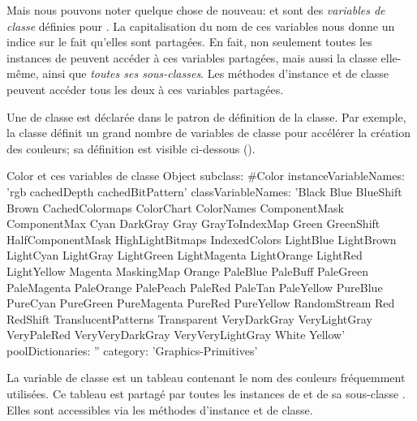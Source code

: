 \documentclass[a4paper,10pt,twoside]{book}
\begin{document}
Mais nous pouvons noter quelque chose de nouveau:  et  sont des \emph{variables de classe} d\'efinies pour .
La capitalisation du nom de ces variables nous donne un indice sur le fait qu'elles sont partag\'ees.
En fait, non seulement toutes les instances de  peuvent acc\'eder
\`a ces variables partag\'ees, mais aussi la classe  elle-m\^eme, ainsi que \emph{toutes ses sous-classes}.
Les m\'ethodes d'instance et de classe peuvent acc\'eder tous les deux
\`a ces variables partag\'ees.


Une  de classe est d\'eclar\'ee dans le patron
de d\'efinition de la classe.
Par exemple, la classe  d\'efinit un grand nombre de variables
de classe pour acc\'el\'erer la cr\'eation des couleurs;
sa d\'efinition est visible ci-dessous ().

\begin{classdef}[Color]{Color et ces variables de classe}
Object subclass: #Color 	
        instanceVariableNames: 'rgb cachedDepth cachedBitPattern'
        classVariableNames: 'Black Blue BlueShift Brown CachedColormaps ColorChart ColorNames ComponentMask ComponentMax Cyan DarkGray Gray GrayToIndexMap Green GreenShift HalfComponentMask HighLightBitmaps IndexedColors LightBlue LightBrown LightCyan LightGray LightGreen LightMagenta LightOrange LightRed LightYellow Magenta MaskingMap Orange PaleBlue PaleBuff PaleGreen PaleMagenta PaleOrange PalePeach PaleRed PaleTan PaleYellow PureBlue PureCyan PureGreen PureMagenta PureRed PureYellow RandomStream Red RedShift TranslucentPatterns Transparent VeryDarkGray VeryLightGray VeryPaleRed VeryVeryDarkGray VeryVeryLightGray White Yellow'
        poolDictionaries: '' 	
        category: 'Graphics-Primitives'
\end{classdef}

La variable de classe  est un tableau contenant le nom des
couleurs fr\'equemment utilis\'ees. Ce tableau est partag\'e par toutes les instances de  et de sa sous-classe . 
Elles sont accessibles via les m\'ethodes d'instance et de classe.
\end{document}
